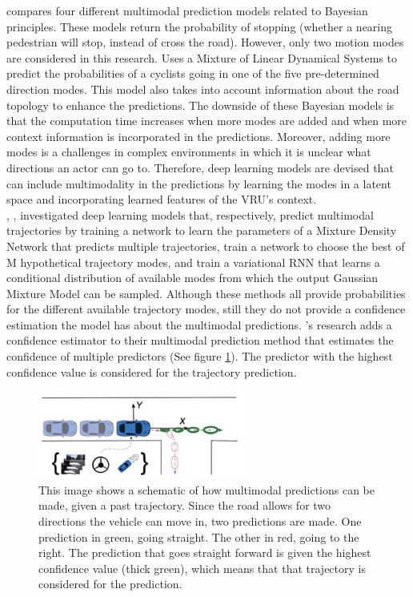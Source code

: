 \cite{keller2013will} compares four different multimodal prediction models related to Bayesian principles. These models return the probability of stopping (whether a nearing pedestrian will stop, instead of cross the road). However, only two motion modes are considered in this research. \cite{pool2017using} Uses a Mixture of Linear Dynamical Systems to predict the probabilities of a cyclists going in one of the five pre-determined direction modes. This model also takes into account information about the road topology to enhance the predictions. The downside of these Bayesian models is that the computation time increases when more modes are added and when more context information is incorporated in the predictions. Moreover, adding more modes is a challenges in complex environments in which it is unclear what directions an actor can go to. Therefore, deep learning models are devised that can include multimodality in the predictions by learning the modes in a latent space and incorporating learned features of the VRU's context. \\
\cite{rehder2018pedestrian}, \cite{cui2019multimodal}, \cite{brito2020social} investigated deep learning models that, respectively, predict multimodal trajectories by training a network to learn the parameters of a Mixture Density Network that predicts multiple trajectories, train a network to choose the best of M hypothetical trajectory modes, and train a variational RNN that learns a conditional distribution of available modes from which the output Gaussian Mixture Model can be sampled. Although these methods all provide probabilities for the different available trajectory modes, still they do not provide a confidence estimation the model has about the multimodal predictions. \cite{huang2019uncertainty}'s research adds a confidence estimator to their multimodal prediction method that estimates the confidence of multiple predictors (See figure \ref{fig:multimod}). The predictor with the highest confidence value is considered for the trajectory prediction. 

\begin{figure}[h!]
	\centering
	\includegraphics[width=0.4\linewidth]{Figures/Introduction/Multimodality_Huang}
	\caption{This image shows a schematic of how multimodal predictions can be made, given a past trajectory. Since the road allows for two directions the vehicle can move in, two predictions are made. One prediction in green, going straight. The other in red, going to the right. The prediction that goes straight forward is given the highest confidence value (thick green), which means that that trajectory is considered for the prediction.  \cite{huang2019uncertainty}}  
	\label{fig:multimod}
\end{figure}

